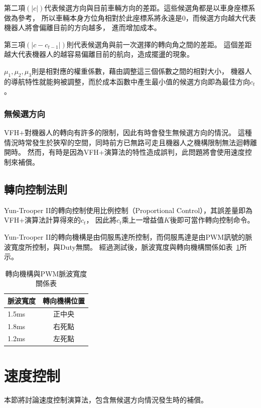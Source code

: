 第二項$(|c|)$代表候選方向與目前車輛方向的差距。這些候選角都是以車身座標系做為參考，
所以車輛本身方位角相對於此座標系將永遠是$0$，而候選方向越大代表機器人將會偏離目前的方向越多，
進而增加成本。

第三項$(|c - c_{t-1}|)$則代表候選角與前一次選擇的轉向角之間的差距。
這個差距越大代表機器人的越容易偏離目前的航向，造成擺盪的現象。

$\mu_1,\mu_2,\mu_3$則是相對應的權重係數，藉由調整這三個係數之間的相對大小，
機器人的導航特性就能夠被調整，而於成本函數中產生最小值的候選方向即為最佳方向$c_t$。

\subsubsection{無候選方向}
VFH+對機器人的轉向有許多的限制，因此有時會發生無候選方向的情況。
這種情況時常發生於狹窄的空間，同時前方已無路可走且機器人之機構限制無法迴轉離開時。
然而，有時是因為VFH+演算法的特性造成誤判，此問題將會使用速度控制來補償。

\subsection{轉向控制法則}
Yun-Trooper II的轉向控制使用比例控制（Proportional Control），其誤差量即為VFH+演算法計算得來的$c_t$，
因此將$c_t$乘上一增益值$K$後即可當作轉向控制命令。

Yun-Trooper II的轉向機構是由伺服馬達所控制，而伺服馬達是由PWM訊號的脈波寬度所控制，與Duty無關。
經過測試後，脈波寬度與轉向機構關係如表~\ref{t:steering}所示。
\begin{table}[h!]
	\centering
	\caption{轉向機構與PWM脈波寬度關係表}
	\begin{tabular}{| l | c |}
		\hline
		脈波寬度	& 轉向機構位置 \\ \hline
		1.5ms		& 正中央 \\ \hline
		1.8ms		& 右死點 \\ \hline
		1.2ms		& 左死點 \\ \hline
	\end{tabular}
	\label{t:steering}
\end{table}

\section{速度控制}
本節將討論速度控制演算法，包含無候選方向情況發生時的補償。

